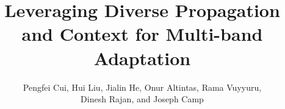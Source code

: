 \documentclass[10pt,conference]{IEEEtran}
\begin{document}
\title{Leveraging Diverse Propagation and Context for Multi-band Adaptation}
\author{Pengfei Cui, Hui Liu, Jialin He, Onur Altintas, Rama Vuyyuru, \\
Dinesh Rajan, and Joseph Camp\\ 
}





\maketitle






%












\end{document}
